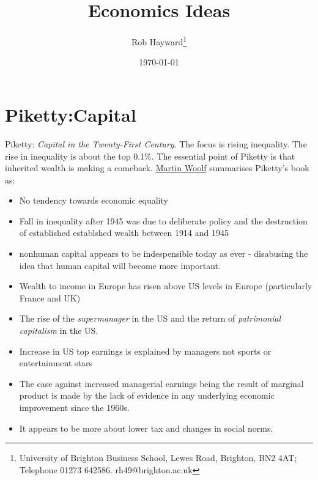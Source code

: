 \documentclass[12pt, a4paper, oneside]{article} %
\begin{document}
\title{Economics Ideas}
\author{Rob Hayward\footnote{University of Brighton Business School, Lewes Road, Brighton, BN2 4AT; Telephone 01273 642586.  rh49@brighton.ac.uk}}
\date{\today}
\maketitle

\section*{Piketty:Capital}
Piketty:  \emph{Capital in the Twenty-First Century}.  The focus is rising inequality.  The rise in inequality is about the top 0.1\%.  The essential point of Piketty is that inherited wealth is making a comeback.  \href{http://www.ft.com/cms/s/2/0c6e9302-c3e2-11e3-a8e0-00144feabdc0.html#axzz2z7YbuMqh}{Martin Woolf} summarises Piketty's book as:
\begin{itemize}
\item No tendency towards economic equality
\item Fall in inequality after 1945 was due to deliberate policy and the destruction of established establshed wealth between 1914 and 1945
\item nonhuman capital appears to be indespensible today as ever - disabusing the idea that human capital will become more important.
\item Wealth to income in Europe has risen above US levels in Europe (particularly France and UK)
\item The rise of the \emph{supermanager} in the US and the return of \emph{patrimonial capitalism} in the US.
\item Increase in US top earnings is explained by managers not sports or entertainment stars
\item The case against increased managerial earnings being the result of marginal product is made by the lack of evidence in any underlying economic improvement since the 1960s.  
\item It appears to be more about lower tax and changes in social norms.
\end{itemize}
\end{document}
